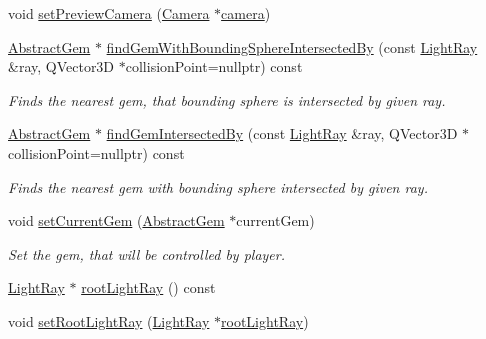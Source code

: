 \begin{DoxyCompactItemize}
\item 
void \hyperlink{class_scene_a84120dfbddf207c955e16b7aae975b8c}{set\+Preview\+Camera} (\hyperlink{class_camera}{Camera} $\ast$\hyperlink{class_scene_ab915c54546b8cecc3ae6bb7c8983518c}{camera})
\item 
\hyperlink{class_abstract_gem}{Abstract\+Gem} $\ast$ \hyperlink{class_scene_af96ea722705769055ef2f9e9572f3fa0}{find\+Gem\+With\+Bounding\+Sphere\+Intersected\+By} (const \hyperlink{class_light_ray}{Light\+Ray} \&ray, Q\+Vector3\+D $\ast$collision\+Point=nullptr) const 
\begin{DoxyCompactList}\small\item\em Finds the nearest gem, that bounding sphere is intersected by given ray. \end{DoxyCompactList}\item 
\hyperlink{class_abstract_gem}{Abstract\+Gem} $\ast$ \hyperlink{class_scene_a2a2cee0a97d8436aac1cd582904af459}{find\+Gem\+Intersected\+By} (const \hyperlink{class_light_ray}{Light\+Ray} \&ray, Q\+Vector3\+D $\ast$collision\+Point=nullptr) const 
\begin{DoxyCompactList}\small\item\em Finds the nearest gem with bounding sphere intersected by given ray. \end{DoxyCompactList}\item 
void \hyperlink{class_scene_afcaeead320358b9d9dd02a113ef97c44}{set\+Current\+Gem} (\hyperlink{class_abstract_gem}{Abstract\+Gem} $\ast$current\+Gem)
\begin{DoxyCompactList}\small\item\em Set the gem, that will be controlled by player. \end{DoxyCompactList}\item 
\hyperlink{class_light_ray}{Light\+Ray} $\ast$ \hyperlink{class_scene_a7de6dcc38dd6398f71af71295ae09966}{root\+Light\+Ray} () const 
\item 
void \hyperlink{class_scene_a3da6be3089fe335bf628ef58d23cda18}{set\+Root\+Light\+Ray} (\hyperlink{class_light_ray}{Light\+Ray} $\ast$\hyperlink{class_scene_a437a4ce938a6de368c2a6abba0ec3f3d}{root\+Light\+Ray})
\end{DoxyCompactItemize}

